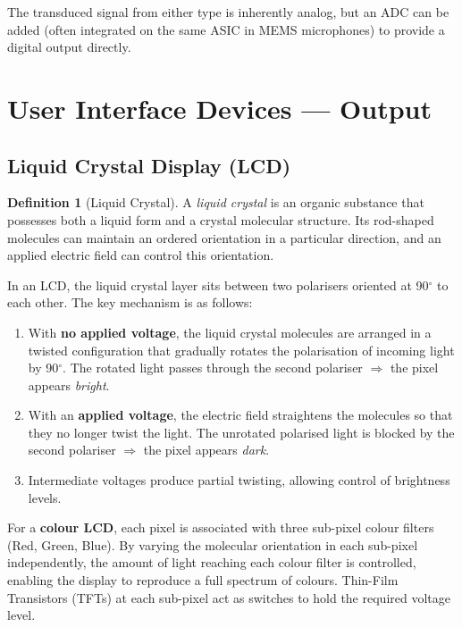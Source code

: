 \documentclass[11pt, a4paper, notitlepage]{report}
\theoremstyle{definition}
\newtheorem{definition}[theorem]{Definition}
\theoremstyle{remark}
\theoremstyle{definition}
\begin{document}
The transduced signal from either type is inherently analog, but an ADC can be added (often integrated on the same ASIC in MEMS microphones) to provide a digital output directly.


\section{User Interface Devices --- Output}
\label{sec:ui-output}

\subsection{Liquid Crystal Display (LCD)}
\label{sec:lcd}

\begin{definition}[Liquid Crystal]
  \label{def:liquid-crystal}
  A \emph{liquid crystal} is an organic substance that possesses both a liquid form and a crystal molecular structure. Its rod-shaped molecules can maintain an ordered orientation in a particular direction, and an applied electric field can control this orientation.
\end{definition}

In an LCD, the liquid crystal layer sits between two polarisers oriented at 90$^\circ$ to each other. The key mechanism is as follows:

\begin{enumerate}
  \item With \textbf{no applied voltage}, the liquid crystal molecules are arranged in a twisted configuration that gradually rotates the polarisation of incoming light by 90$^\circ$. The rotated light passes through the second polariser $\Rightarrow$ the pixel appears \emph{bright}.
  \item With an \textbf{applied voltage}, the electric field straightens the molecules so that they no longer twist the light. The unrotated polarised light is blocked by the second polariser $\Rightarrow$ the pixel appears \emph{dark}.
  \item Intermediate voltages produce partial twisting, allowing control of brightness levels.
\end{enumerate}

For a \textbf{colour LCD}, each pixel is associated with three sub-pixel colour filters (Red, Green, Blue). By varying the molecular orientation in each sub-pixel independently, the amount of light reaching each colour filter is controlled, enabling the display to reproduce a full spectrum of colours. Thin-Film Transistors (TFTs) at each sub-pixel act as switches to hold the required voltage level.
\end{document}
